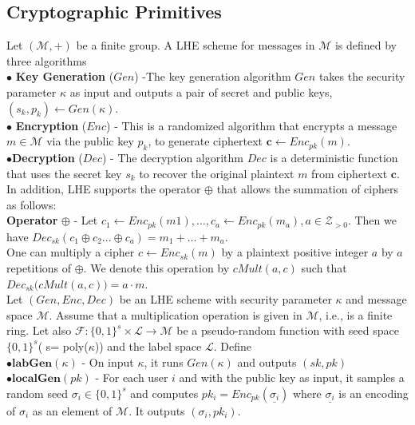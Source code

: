 \subsection{Cryptographic Primitives}
Let $(\mathcal{M}, +)$ be a finite group. A \textsf{LHE} scheme
for messages in $\mathcal{M}$ is defined  by three algorithms \\
$\bullet$ \textbf{Key Generation }($Gen$) -The key generation algorithm $Gen$ takes the security parameter $\kappa$ as input and outputs
a pair of secret and public keys, $(s_k, p_k) \leftarrow Gen(\kappa)$.\\
$\bullet$ \textbf{Encryption} ($Enc$) - This is a randomized algorithm that encrypts a message $m \in \mathcal{M}$ via the public key $p_k$, to generate ciphertext $\mathbf{c} \leftarrow Enc_{pk}(m)$.\\
$\bullet$\textbf{Decryption} ($Dec$) - The decryption algorithm $Dec$ is a deterministic function that uses the secret key $s_k$ to
recover the original plaintext $m$ from ciphertext $\mathbf{c}$.
\\
In addition, \textsf{LHE} supports the operator $\oplus$ that allows the summation of ciphers as follows:
\\ \textbf{Operator} $\oplus$ - Let $c_1 \leftarrow Enc_{pk}(m1), \ldots, c_a \leftarrow Enc_{pk}(m_a), a \in \mathcal{Z}_{>0}$. Then we have  $Dec_{sk}(c_1\oplus c_2 ...\oplus c_a)=    m_1 + \ldots   + m_a$.  \\
One can multiply a cipher $c\leftarrow  Enc_{sk}(m)$ by a plaintext positive integer $a$ by $a$ repetitions of $\oplus$. We denote this operation by $cMult(a,c)$ such that $Dec_{sk}\big(cMult(a,c)\big)=a\cdot m$.\\
Let $(Gen,Enc,Dec)$ be an \textsf{LHE} scheme with security parameter $\kappa$ and message space $\mathcal{M}$. Assume that a multiplication operation is given in $\mathcal{M}$, i.e., is a finite ring. Let also $\mathcal{F}:\{0,1\}^s \times \mathcal{L}\rightarrow \mathcal{M}$ be a pseudo-random function with seed space $\{0,1\}^s$( s= poly($\kappa $)) and the label space $\mathcal{L}$. Define
\\
 $\bullet \textbf{labGen}(\kappa)$ - On input $\kappa$, it runs $Gen(\kappa)$ and outputs $(sk,pk)$
\\$\bullet \textbf{localGen}(pk)$ -  For each user $i$ and with the public key as input, it samples a random seed $\sigma_i \in \{0,1\}^s$ and computes $pk_i = Enc_{pk}(\underline{\sigma_i})$ where $\underline{\sigma_i}$ is an  encoding of $\sigma_i$ as an  element of $\mathcal{M}$. It outputs $(\sigma_i,pk_i)$.\\
